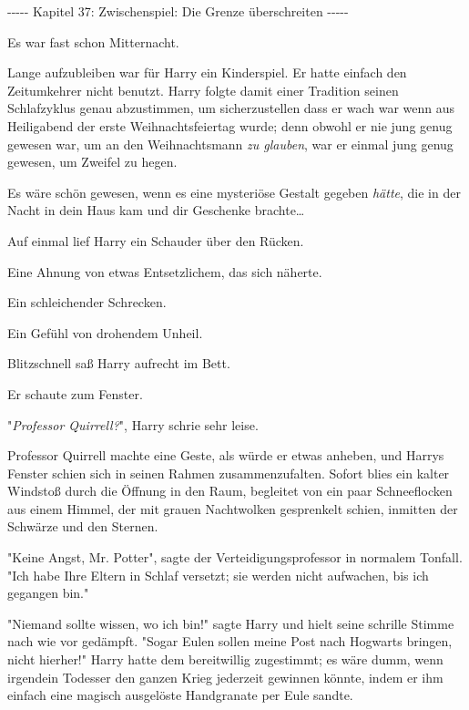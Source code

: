 

\hypertarget{zwischenspiel-die-grenze-uxfcberschreiten}{%

-\/-\/-\/-\/- Kapitel 37: Zwischenspiel: Die Grenze überschreiten -\/-\/-\/-\/-

Es war fast schon Mitternacht.

Lange aufzubleiben war für Harry ein Kinderspiel. Er hatte einfach den Zeitumkehrer nicht benutzt. Harry folgte damit einer Tradition seinen Schlafzyklus genau abzustimmen, um sicherzustellen dass er wach war wenn aus Heiligabend der erste Weihnachtsfeiertag wurde; denn obwohl er nie jung genug gewesen war, um an den Weihnachtsmann \emph{zu glauben}, war er einmal jung genug gewesen, um Zweifel zu hegen.

Es wäre schön gewesen, wenn es eine mysteriöse Gestalt gegeben \emph{hätte}, die in der Nacht in dein Haus kam und dir Geschenke brachte…

Auf einmal lief Harry ein Schauder über den Rücken.

Eine Ahnung von etwas Entsetzlichem, das sich näherte.

Ein schleichender Schrecken.

Ein Gefühl von drohendem Unheil.

Blitzschnell saß Harry aufrecht im Bett.

Er schaute zum Fenster.

"\emph{Professor Quirrell?}", Harry schrie sehr leise.

Professor Quirrell machte eine Geste, als würde er etwas anheben, und Harrys Fenster schien sich in seinen Rahmen zusammenzufalten. Sofort blies ein kalter Windstoß durch die Öffnung in den Raum, begleitet von ein paar Schneeflocken aus einem Himmel, der mit grauen Nachtwolken gesprenkelt schien, inmitten der Schwärze und den Sternen.

"Keine Angst, Mr. Potter", sagte der Verteidigungsprofessor in normalem Tonfall. "Ich habe Ihre Eltern in Schlaf versetzt; sie werden nicht aufwachen, bis ich gegangen bin."

"Niemand sollte wissen, wo ich bin!" sagte Harry und hielt seine schrille Stimme nach wie vor gedämpft. "Sogar Eulen sollen meine Post nach Hogwarts bringen, nicht hierher!" Harry hatte dem bereitwillig zugestimmt; es wäre dumm, wenn irgendein Todesser den ganzen Krieg jederzeit gewinnen könnte, indem er ihm einfach eine magisch ausgelöste Handgranate per Eule sandte.

}
